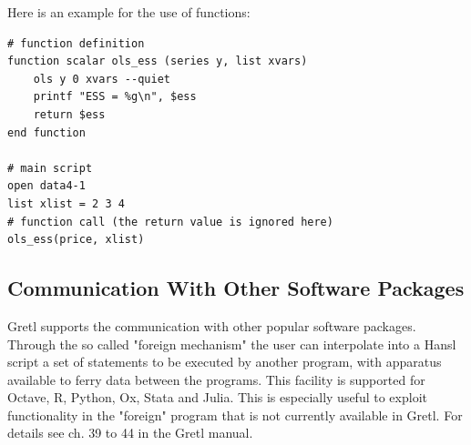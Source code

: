 \documentclass[11pt]{article}
\begin{document}
Here is an example for the use of functions:
\begin{Verbatim}[baselinestretch=0.75, fontsize=\small, frame=single]
# function definition
function scalar ols_ess (series y, list xvars)
	ols y 0 xvars --quiet
	printf "ESS = %g\n", $ess
	return $ess
end function

# main script
open data4-1
list xlist = 2 3 4
# function call (the return value is ignored here)
ols_ess(price, xlist)
\end{Verbatim}


\subsection{Communication With Other Software Packages}
\label{sec:foreign}
Gretl supports the communication with other popular software packages. Through the so called "foreign mechanism" the user can interpolate into a Hansl script a set of statements to be executed by another program, with apparatus available to ferry data between the programs. This facility is supported for Octave, R, Python, Ox, Stata and Julia. This is especially useful to exploit functionality in the "foreign" program that is not currently available in Gretl. For details see ch. 39 to 44 in the Gretl manual.
\end{document}
